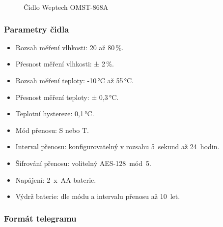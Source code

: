 \begin{figure}[!ht]
\vspace{-5pt}
    \centering
			\hspace*{5mm}
		\caption{Čidlo Weptech OMST-868A~\cite{CidloWeptech}}
		\vspace{-25pt}
\end{figure}

\subsubsection{Parametry čidla}
\begin{itemize}
	\item Rozsah měření vlhkosti: 20 až 80\,\%.
	\item Přesnost měření vlhkosti: ± 2\,\%.
	\item Rozsah měření teploty: -10\,°C až 55\,°C.
	\item Přesnost měření teploty: ± 0,3\,°C.
	\item Teplotní hystereze: 0,1\,°C.
	\item Mód přenosu: S nebo T.
	\item Interval přenosu: konfigurovatelný v rozsahu 5~sekund až 24~hodin.
	\item Šifrování přenosu: volitelný AES-128~mód~5.
	\item Napájení: 2~x~AA baterie.
	\item Výdrž baterie: dle módu a intervalu přenosu až 10~let.
\end{itemize}


\subsubsection{Formát telegramu}

